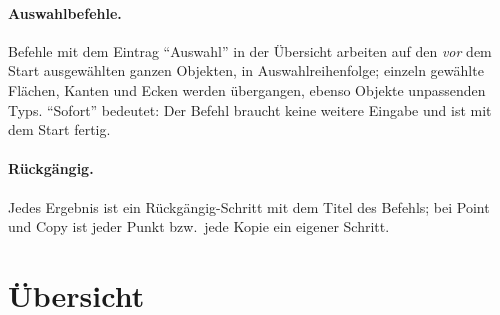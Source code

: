 \paragraph{Auswahlbefehle.} Befehle mit dem Eintrag \enquote{Auswahl} in der Übersicht arbeiten
auf den \emph{vor} dem Start ausgewählten ganzen Objekten, in Auswahlreihenfolge; einzeln
gewählte Flächen, Kanten und Ecken werden übergangen, ebenso Objekte unpassenden Typs.
\enquote{Sofort} bedeutet: Der Befehl braucht keine weitere Eingabe und ist mit dem Start
fertig.

\paragraph{Rückgängig.} Jedes Ergebnis ist ein Rückgängig-Schritt mit dem Titel des Befehls;
bei Point und Copy ist jeder Punkt bzw.\ jede Kopie ein eigener Schritt.

\section{Übersicht}\label{sec:befehle-uebersicht}

